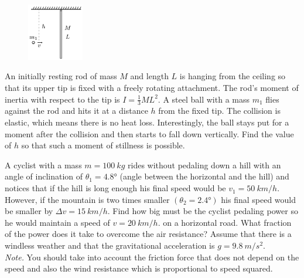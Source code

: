 \documentclass[11pt]{article}
\begin{document}

\probeng
\begin{figure}
\includegraphics[width=0.22\textwidth]{2015-v2g-06-porgejoonis}
\end{figure}
An initially resting rod of mass $M$ and length $L$ is hanging from the ceiling so that its upper tip is fixed with a freely rotating attachment. The rod’s moment of inertia with respect to the tip is $I=\frac{1}{3}ML^2$. A steel ball with a mass $m_1$ flies against the rod and hits it at a distance $h$ from the fixed tip. The collision is elastic, which means there is no heat loss. Interestingly, the ball stays put for a moment after the collision and then starts to fall down vertically. Find the value of $h$ so that such a moment of stillness is possible.
\probend
\bigskip


\probeng
A cyclist with a mass $m=\SI{100}{kg}$ rides without pedaling down a hill with an angle of inclination of $\theta_{1}=\ang{4.8}$ (angle between the horizontal and the hill) and notices that if the hill is long enough his final speed would be $v_{1}=\SI{50}{km/h}$. However, if the mountain is two times smaller $(\theta_{2}=\ang{2.4})$ his final speed would be smaller by $\Delta v=\SI{15}{km/h}$. Find how big must be the cyclist pedaling power so he would maintain a speed of $v=\SI{20}{km/h}.$ on a horizontal road. What fraction of the power does it take to overcome the air resistance? Assume that there is a windless weather and that the gravitational acceleration is $g=\SI{9.8}{m/s^{2}}$. \\
\emph{Note.} You should take into account the friction force that does not depend on the speed and also the wind resistance which is proportional to speed squared.
\probend
\bigskip

\end{document}
